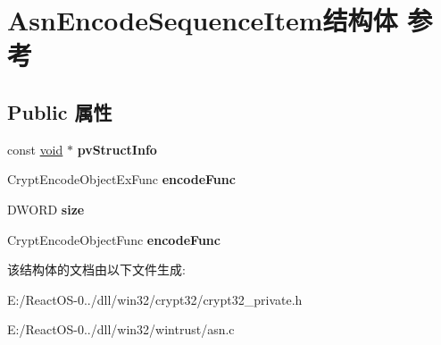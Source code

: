 \hypertarget{struct_asn_encode_sequence_item}{}\section{Asn\+Encode\+Sequence\+Item结构体 参考}
\label{struct_asn_encode_sequence_item}
\subsection*{Public 属性}
\begin{DoxyCompactItemize}
\item 
\mbox{\label{struct_asn_encode_sequence_item_ac72a9802a6dd6ab7d664e10ce14ff550}} 
const \hyperlink{interfacevoid}{void} $\ast$ {\bfseries pv\+Struct\+Info}
\item 
\mbox{\label{struct_asn_encode_sequence_item_ab49ed9dfe0712c453a7e97979e5e3b9b}} 
Crypt\+Encode\+Object\+Ex\+Func {\bfseries encode\+Func}
\item 
\mbox{\label{struct_asn_encode_sequence_item_a54cf07e866c271bbf0b2e6bf2bd61a69}} 
D\+W\+O\+RD {\bfseries size}
\item 
\mbox{\label{struct_asn_encode_sequence_item_ade773b7095b1a560178067bd502d81c6}} 
Crypt\+Encode\+Object\+Func {\bfseries encode\+Func}
\end{DoxyCompactItemize}


该结构体的文档由以下文件生成\+:\begin{DoxyCompactItemize}
\item 
E\+:/\+React\+O\+S-\/0../dll/win32/crypt32/crypt32\+\_\+private.\+h\item 
E\+:/\+React\+O\+S-\/0../dll/win32/wintrust/asn.\+c\end{DoxyCompactItemize}
